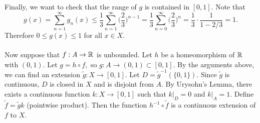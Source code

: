 \begin{frame*}
{Finally, we want to check that the range of $g$ is contained in $[0,1].$ Note that
$$g(x)=\sum\limits_{n=1}^{\infty}g_n(x)\leq\frac{1}{3}\sum\limits_{n=1}^{\infty}\Big(\frac{2}{3}\Big)^{n-1}=\frac{1}{3}\sum\limits_{n=0}^{\infty}\Big(\frac{2}{3}\Big)^n=\frac{1}{3}\cdot\frac{1}{1-2/3}=1.$$
Therefore $0\leq g(x)\leq 1$ for all $x\in X.$ \\ \\
Now suppose that $f:A\rightarrow\mathbb{R}^{}$ is unbounded. Let $h$ be a homeomorphism of $\mathbb{R}^{}$ with $(0,1).$ Let $g=h\circ f,$ so $g:A\rightarrow(0,1)\subset[0,1].$ By the arguments above, we can find an extension $\tilde{g}:X\rightarrow[0,1].$ Let $D=\tilde{g}^{-1}(\{0,1\}).$ Since $\tilde{g}$ is continuous, $D$ is closed in $X$ and is disjoint from $A.$ By Urysohn's Lemma, there exists a continuous function $k:X\rightarrow[0,1]$ such that $k|_D=0$ and $k|_A=1.$ Define $\tilde{f}=\tilde{g}k$ (pointwise product). Then the function $h^{-1}\circ\tilde{f}$ is a continuous extension of $f$ to $X.$
}
\end{frame*}